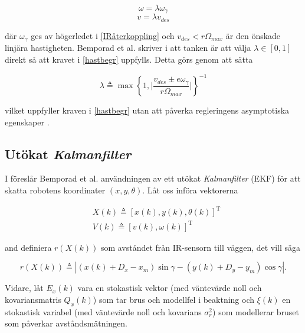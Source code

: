 \documentclass[11pt]{article}
\begin{document}
\begin{flushleft}
\begin{equation}
	\omega = \lambda \omega_\gamma
\end{equation}
\begin{equation}
	v = \lambda v_{des}
\end{equation}

där $\omega_\gamma$ ges av högerledet i \eqref{IRåterkoppling} och $v_{des} < r \Omega_{max}$ är den önskade linjära hastigheten. Bemporad et al. skriver i \cite{wfp} att tanken är att välja $\lambda \in [0,1]$ direkt så att kravet i \eqref{hastbegr} uppfylls. Detta görs genom att sätta

\begin{equation}\label{haståterkoppling}
	\lambda \triangleq \max{\left\{ 1, \bigg| \frac {v_{des} \pm e \omega_\gamma} {r \Omega_{max}} \bigg|  \right\}}^{-1}
\end{equation}

vilket uppfyller kraven i \eqref{hastbegr} utan att påverka regleringens asymptotiska egenskaper \cite{wfp}.

\subsection{Utökat \emph{Kalmanfilter}}\label{EKF}
I \cite{wfp} föreslår Bemporad et al. användningen av ett utökat \emph{Kalmanfilter} (EKF) för att skatta robotens koordinater $(x,y,\theta)$. Låt oss införa vektorerna 

\begin{equation*}
	\begin{aligned}
	&X(k) \triangleq [x(k), y(k), \theta(k)]^{\textrm{T}} \\
	&V(k) \triangleq [v(k), \omega(k)]^{\textrm{T}}
	\end{aligned}
\end{equation*}

and definiera $r(X(k))$ som avståndet från IR-sensorn till väggen, det vill säga

\begin{equation*}
	r(X(k)) \triangleq | (x(k) + D_x - x_m) \sin \gamma - (y(k) + D_y - y_m) \cos \gamma |.
\end{equation*}

Vidare, låt $E_x(k)$ vara en stokastisk vektor (med väntevärde noll och kovariansmatris $Q_x(k)$) som tar brus och modellfel i beaktning och $\xi(k)$ en stokastisk variabel (med väntevärde noll och kovarians $\sigma_r^2$) som modellerar bruset som påverkar avståndsmätningen.


\end{flushleft}
\end{document}
